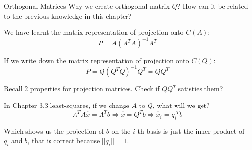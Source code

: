 \documentclass{beamer}
\begin{document}
\begin{frame}{Orthogonal Matrices}
Why we create orthogonal matrix $Q$? How can it be related to the previous knowledge in this chapter?

\vspace{3pt}
We have learnt the matrix representation of projection onto $C(A)$:
\begin{equation*}
    P=A(A^TA)^{-1}A^T
\end{equation*}

If we write down the matrix representation of projection onto $C(Q)$:
\begin{equation*}
    P=Q(Q^TQ)^{-1}Q^T=QQ^T
\end{equation*}

\vspace{3pt}
Recall 2 properties for projection matrices. Check if $QQ^T$ satisties them?

\vspace{3pt}
In Chapter 3.3 least-squares, if we change $A$ to $Q$, what will we get?
\begin{equation*}
    A^TA\hat{x}=A^Tb\Rightarrow \hat{x}=Q^Tb\Rightarrow \hat{x}_i={q_i}^Tb
\end{equation*}

Which shows us the projection of $b$ on the $i$-th basis is just the inner product of $q_i$ and $b$, that is correct because $||q_i||=1$.
\end{frame}
\end{document}
